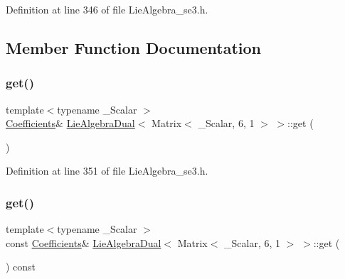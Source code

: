 Definition at line 346 of file Lie\+Algebra\+\_\+se3.\+h.



\subsection{Member Function Documentation}
\hypertarget{class_lie_algebra_dual_3_01_matrix_3_01___scalar_00_016_00_011_01_4_01_4_a4ec6e6c98b92fd7f55e065cc122ddcfc}{}\label{class_lie_algebra_dual_3_01_matrix_3_01___scalar_00_016_00_011_01_4_01_4_a4ec6e6c98b92fd7f55e065cc122ddcfc} 
\subsubsection{\texorpdfstring{get()}{get()}\hspace{0.1cm}{\footnotesize\ttfamily [1/2]}}
{\footnotesize\ttfamily template$<$typename \+\_\+\+Scalar $>$ \\
\hyperlink{class_lie_algebra_dual_3_01_matrix_3_01___scalar_00_016_00_011_01_4_01_4_ae22cd667e4ac77db27cc018db14003bd}{Coefficients}\& \hyperlink{class_lie_algebra_dual}{Lie\+Algebra\+Dual}$<$ Matrix$<$ \+\_\+\+Scalar, 6, 1 $>$ $>$\+::get (\begin{DoxyParamCaption}{ }\end{DoxyParamCaption})\hspace{0.3cm}{\ttfamily [inline]}}



Definition at line 351 of file Lie\+Algebra\+\_\+se3.\+h.

\hypertarget{class_lie_algebra_dual_3_01_matrix_3_01___scalar_00_016_00_011_01_4_01_4_ae618e2d8cc6c4f7bcfa1b237b1dd7654}{}\label{class_lie_algebra_dual_3_01_matrix_3_01___scalar_00_016_00_011_01_4_01_4_ae618e2d8cc6c4f7bcfa1b237b1dd7654} 
\subsubsection{\texorpdfstring{get()}{get()}\hspace{0.1cm}{\footnotesize\ttfamily [2/2]}}
{\footnotesize\ttfamily template$<$typename \+\_\+\+Scalar $>$ \\
const \hyperlink{class_lie_algebra_dual_3_01_matrix_3_01___scalar_00_016_00_011_01_4_01_4_ae22cd667e4ac77db27cc018db14003bd}{Coefficients}\& \hyperlink{class_lie_algebra_dual}{Lie\+Algebra\+Dual}$<$ Matrix$<$ \+\_\+\+Scalar, 6, 1 $>$ $>$\+::get (\begin{DoxyParamCaption}{ }\end{DoxyParamCaption}) const\hspace{0.3cm}{\ttfamily [inline]}}



